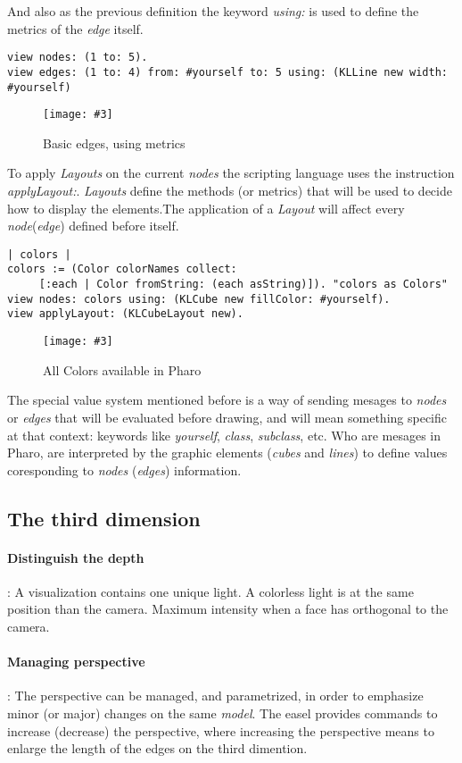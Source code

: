 \documentclass[runningheads]{llncs}
\newcommand{\fig}[4]{
	\begin{figure}[#1]
		\centering
		\texttt{[image: \#3]}
		\caption{\label{fig:#3}#4}
	\end{figure}}
\newcommand{\seclabel}[1]{\label{sec:#1}}
\begin{document}
And also as the previous definition the keyword \emph{using:} is used
to define the metrics of the \emph{edge} itself.  
\begin{lstlisting}
view nodes: (1 to: 5).	
view edges: (1 to: 4) from: #yourself to: 5 using: (KLLine new width: #yourself)
\end{lstlisting}
\fig{}{0.5}{figure5.png}{Basic edges, using metrics}

To apply \emph{Layouts} on the current \emph{nodes} the scripting
language uses the instruction \emph{applyLayout:}. \emph{Layouts}
define the methods (or metrics) that will be used to decide how
to display the elements.The application of a \emph{Layout} will 
affect every \emph{node}(\emph{edge}) defined before itself.
\begin{lstlisting}
| colors |
colors := (Color colorNames collect: 
	 [:each | Color fromString: (each asString)]). "colors as Colors"
view nodes: colors using: (KLCube new fillColor: #yourself).
view applyLayout: (KLCubeLayout new).
\end{lstlisting}
\fig{}{0.3}{figure6.png}{All Colors available in Pharo}
 
The special value system mentioned before is a way of sending
mesages to \emph{nodes} or \emph{edges} that will be evaluated
before drawing, and will mean something specific at that context:
keywords like \emph{yourself}, \emph{class}, \emph{subclass}, etc.
Who are mesages in Pharo, are interpreted by the graphic
elements (\emph{cubes} and \emph{lines}) to define values
coresponding to \emph{nodes} (\emph{edges}) information. 
\subsection{The third dimension} \seclabel{3d}

\paragraph{Distinguish the depth}: 
A visualization contains one unique light. 
A colorless light is at the same position than the camera. 
Maximum intensity when a face has orthogonal to the camera.

\paragraph{Managing perspective}: %
The perspective can be managed, and parametrized,
in order to emphasize minor (or major) changes on the same
\emph{model}. The easel provides commands to increase 
(decrease) the perspective, where increasing the
perspective means to enlarge the length of the edges on the
third dimention. 
\end{document}
